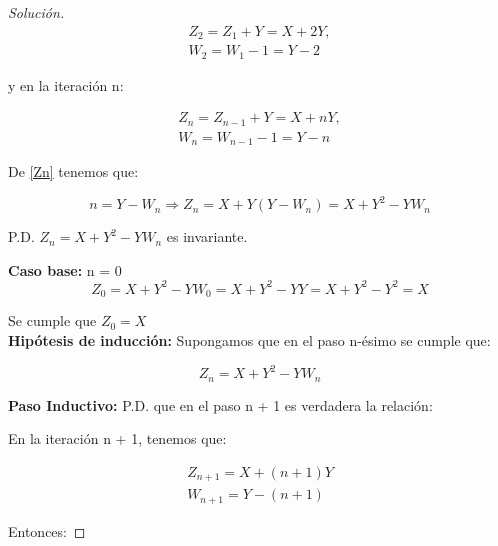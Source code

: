 \documentclass[11pt]{article}
\begin{document}
\begin{enumerate}
\begin{proof}[Solución]
    \begin{equation*}
      \begin{split}
        Z_2 = Z_1 + Y = X + 2Y,\\W_2 = W_1 - 1 = Y - 2
      \end{split}
    \end{equation*}

    y en la iteración n:

    \begin{equation}
      \label{Zn}
      \begin{split}
        Z_n = Z_{n-1} + Y = X + nY,\\W_n = W_{n-1} - 1 = Y - n
      \end{split}
    \end{equation}

    De \ref{Zn} tenemos que:

    \begin{equation}
        n = Y - W_n \Rightarrow Z_n = X + Y(Y - W_n) = X + Y^2 - YW_n
    \end{equation}

    P.D. $Z_n = X + Y^2 - YW_n$ es invariante.

    \textbf{Caso base:} n = 0\\
    \begin{equation*}
      Z_0 = X + Y^2 - YW_0 = X + Y^2 - YY = X + Y^2 - Y^2 = X
    \end{equation*}

    Se cumple que $Z_0 = X$\\
    \textbf{Hipótesis de inducción:} Supongamos que en el paso n-ésimo
    se cumple que:

    \begin{equation}
      Z_n = X + Y^2-YW_n
    \end{equation}

   \textbf{Paso Inductivo:} P.D. que en el paso n + 1 es verdadera la
   relación:

   En la iteración n + 1, tenemos que:

   \begin{equation*}
     \begin{split}
       Z_{n+1} = X + (n + 1)Y\\
       W_{n+1} = Y - (n + 1)
     \end{split}
   \end{equation*}

   Entonces:


\end{proof}
\end{enumerate}
\end{document}
